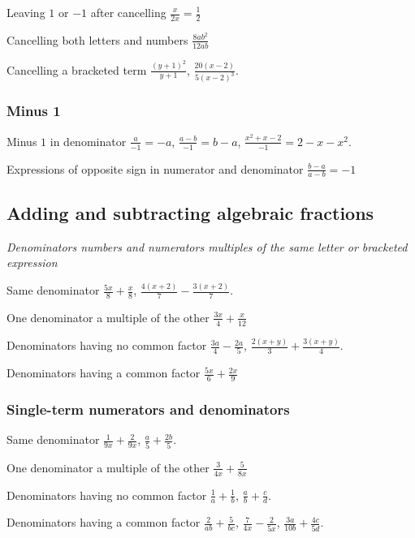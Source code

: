 \documentclass{article}
\begin{document}
Leaving \(1\) or \(-1\) after cancelling \hfill \(\frac{x}{2x} = \frac{1}{2}\)

Cancelling both letters and numbers \hfill \(\frac{8ab^2}{12ab}\)

Cancelling a bracketed term \hfill \(\frac{(y+1)^2}{y+1}\), \(\frac{20(x-2)}{5(x-2)^3}\).

\subsubsection{Minus 1}

Minus \(1\) in denominator \hfill \(\frac{a}{-1} = -a\), \(\frac{a-b}{-1} = b - a\), \(\frac{x^2+x-2}{-1}= 2 - x - x^2\).

Expressions of opposite sign in numerator and denominator \hfill \(\frac{b-a}{a-b} = -1\)

\subsection{Adding and subtracting algebraic fractions}

\textit{Denominators numbers and numerators multiples of the same letter or bracketed expression}

Same denominator \hfill \(\frac{5x}{8} + \frac{x}{8}\), \(\frac{4(x+2)}{7} - \frac{3(x+2)}{7}\).

One denominator a multiple of the other \hfill  \(\frac{3x}{4} + \frac{x}{12}\)

Denominators having no common factor \hfill \(\frac{3a}{4}-\frac{2a}{5}\), \(\frac{2(x+y)}{3}+\frac{3(x+y)}{4}\).

Denominators having a common factor \hfill \(\frac{5x}{6}+\frac{2x}{9}\)

\subsubsection{Single-term numerators and denominators}

Same denominator \hfill \(\frac{1}{9x}+\frac{2}{9x}\), \(\frac{a}{5}+\frac{2b}{5}\).

One denominator a multiple of the other \hfill \(\frac{3}{4x} + \frac{5}{8x}\)

Denominators having no common factor \hfill \(\frac{1}{a} + \frac{1}{b}\), \(\frac{a}{b}+\frac{c}{d}\).

Denominators having a common factor \hfill \(\frac{2}{ab} + \frac{5}{bc}\), \(\frac{7}{4x} - \frac{2}{5x}\), \(\frac{3a}{10b}+\frac{4c}{5d}\).
\end{document}

